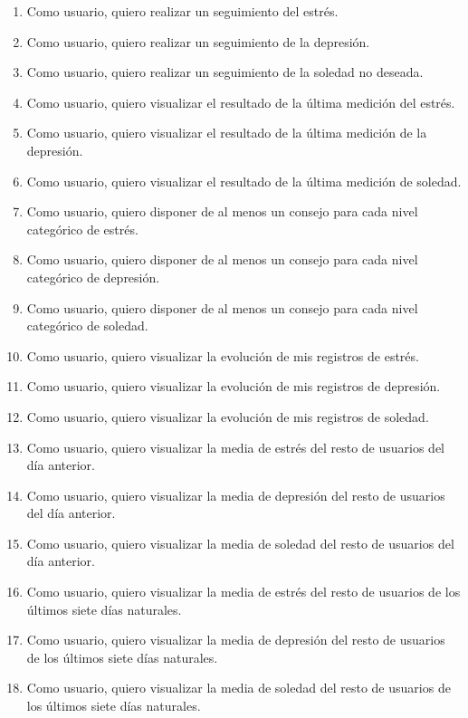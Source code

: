         \begin{enumerate}[label=\textbf{\texttt{RU-\arabic*}}]
            \item Como usuario, quiero realizar un seguimiento del estrés.
            \item Como usuario, quiero realizar un seguimiento de la depresión.
            \item Como usuario, quiero realizar un seguimiento de la soledad no deseada.
            \item Como usuario, quiero visualizar el resultado de la última medición del estrés.
            \item Como usuario, quiero visualizar el resultado de la última medición de la depresión.
            \item Como usuario, quiero visualizar el resultado de la última medición de soledad.
            \item Como usuario, quiero disponer de al menos un consejo para cada nivel categórico de estrés.
            \item Como usuario, quiero disponer de al menos un consejo para cada nivel categórico de depresión.
            \item Como usuario, quiero disponer de al menos un consejo para cada nivel categórico de soledad.
            \item Como usuario, quiero visualizar la evolución de mis registros de estrés.
            \item Como usuario, quiero visualizar la evolución de mis registros de depresión.
            \item Como usuario, quiero visualizar la evolución de mis registros de soledad.
            \item Como usuario, quiero visualizar la media de estrés del resto de usuarios del día anterior.
            \item Como usuario, quiero visualizar la media de depresión del resto de usuarios del día anterior.
            \item Como usuario, quiero visualizar la media de soledad del resto de usuarios del día anterior.
            \item Como usuario, quiero visualizar la media de estrés del resto de usuarios de los últimos siete días naturales.
            \item Como usuario, quiero visualizar la media de depresión del resto de usuarios de los últimos siete días naturales.
            \item Como usuario, quiero visualizar la media de soledad del resto de usuarios de los últimos siete días naturales.

\end{enumerate}

